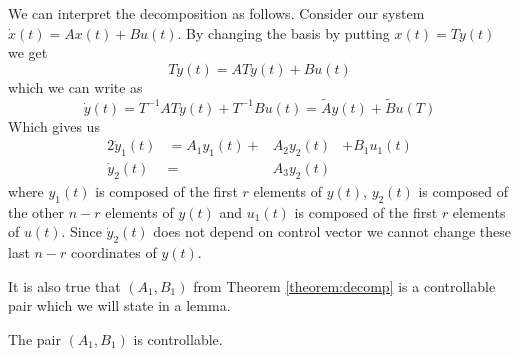 We can interpret the decomposition as follows. Consider our system $\dot{x}(t)=Ax(t)+Bu(t)$. By changing the basis by putting $x(t)=Ty(t)$ we get $$T\dot{y}(t)=ATy(t)+Bu(t)$$ which we can write as $$\dot{y}(t)=T^{-1}ATy(t)+T^{-1}Bu(t)=\widetilde{A}y(t)+\widetilde{B}u(T)$$ Which gives us 
\begin{alignat*}{2}
	\dot{y}_1(t)&=A_1y_1(t)+&A_2y_2(t)&+B_1u_1(t) \\
	\dot{y}_2(t)&=&A_3y_2(t)&
\end{alignat*}
where $y_1(t)$ is composed of the first $r$ elements of $y(t)$, $y_2(t)$ is composed of the other $n-r$ elements of $y(t)$ and $u_1(t)$ is composed of the first $r$ elements of $u(t)$. Since $\dot{y}_2(t)$ does not depend on control vector we cannot change these last $n-r$ coordinates of $y(t)$.

It is also true that $(A_1,B_1)$ from Theorem \ref{theorem:decomp} is a controllable pair which we will state in a lemma.

\begin{lemma}
	The pair $(A_1,B_1)$ is controllable.
\end{lemma}

